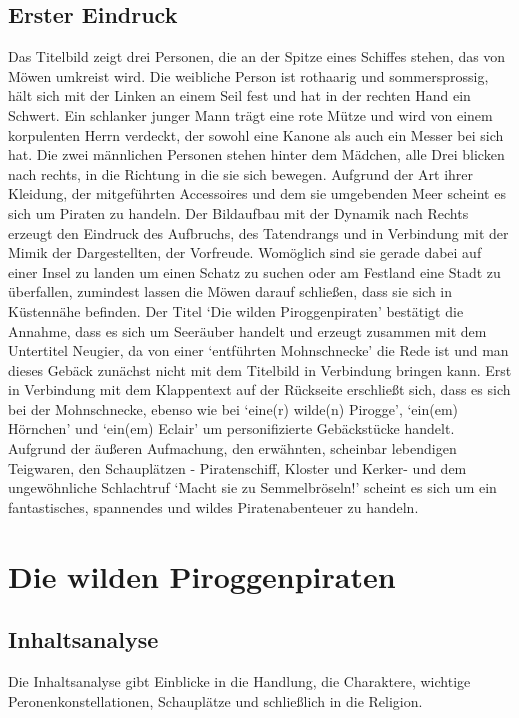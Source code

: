 \section{Erster Eindruck}
Das Titelbild zeigt drei Personen, die an der Spitze eines Schiffes stehen, das von Möwen umkreist wird. Die weibliche Person ist rothaarig und sommersprossig, hält sich mit der Linken an einem Seil fest und hat in der rechten Hand ein Schwert. Ein schlanker junger Mann trägt eine rote Mütze und wird von einem korpulenten Herrn verdeckt, der sowohl eine Kanone als auch ein Messer bei sich hat. Die zwei männlichen Personen stehen hinter dem Mädchen, alle Drei blicken nach rechts, in die Richtung in die sie sich bewegen. Aufgrund der Art ihrer Kleidung, der mitgeführten Accessoires und dem sie umgebenden Meer scheint es sich um Piraten zu handeln. Der Bildaufbau mit der Dynamik nach Rechts erzeugt den Eindruck des Aufbruchs, des Tatendrangs und in Verbindung mit der Mimik der Dargestellten, der Vorfreude. Womöglich sind sie gerade dabei auf einer Insel zu landen um einen Schatz zu suchen oder am Festland eine Stadt zu überfallen, zumindest lassen die Möwen darauf schließen, dass sie sich in Küstennähe befinden.
Der Titel `Die wilden Piroggenpiraten' bestätigt die Annahme, dass es sich um Seeräuber handelt und erzeugt zusammen mit dem Untertitel Neugier, da von einer `entführten Mohnschnecke' die Rede ist und man dieses Gebäck zunächst nicht mit dem Titelbild in Verbindung bringen kann. Erst in Verbindung mit dem Klappentext auf der Rückseite erschließt sich, dass es sich bei der Mohnschnecke, ebenso wie bei `eine(r) wilde(n) Pirogge', `ein(em) Hörnchen' und `ein(em) Eclair' um personifizierte Gebäckstücke handelt. Aufgrund der äußeren Aufmachung, den erwähnten, scheinbar lebendigen Teigwaren, den Schauplätzen - Piratenschiff, Kloster und Kerker- und dem ungewöhnliche Schlachtruf `Macht sie zu Semmelbröseln!' scheint es sich um ein fantastisches, spannendes und wildes Piratenabenteuer zu handeln.

\chapter{Die wilden Piroggenpiraten}

\section{Inhaltsanalyse}
Die Inhaltsanalyse gibt Einblicke in die Handlung, die Charaktere, wichtige Peronenkonstellationen, Schauplätze und schließlich in die Religion.

